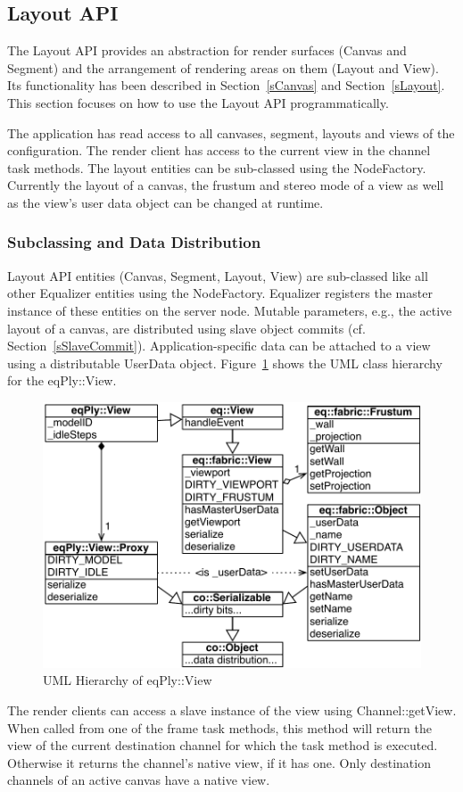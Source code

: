\documentclass[10pt,a4]{scrartcl}
\newcommand{\fig}[1]{Figure~\ref{#1}}
\newcommand{\sref}[1]{Section~\ref{#1}}
\begin{document}
\subsection{\label{sLayoutAPI}Layout API}

The Layout API provides an abstraction for render surfaces (Canvas and
Segment) and the arrangement of rendering areas on them (Layout and
View). Its functionality has been described in \sref{sCanvas} and
\sref{sLayout}. This section focuses on how to use the Layout API
programmatically. 

The application has read access to all canvases, segment, layouts and views of
the configuration. The render client has access to the current view in the
channel task methods. The layout entities can be sub-classed using the
\textsf{NodeFactory}. Currently the layout of a canvas, the frustum and stereo
mode of a view as well as the view's user data object can be changed at runtime.


\subsubsection{Subclassing and Data Distribution}

Layout API entities (Canvas, Segment, Layout, View) are sub-classed like all
other Equalizer entities using the \textsf{NodeFactory}. Equalizer registers the
master instance of these entities on the server node. Mutable parameters, e.g.,
the active layout of a canvas, are distributed using slave object commits
(cf. \sref{sSlaveCommit}). Application-specific data can be attached to a view
using a distributable \textsf{UserData} object. \fig{fViewUML} shows the UML
class hierarchy for the \textsf{eqPly::View}.

\begin{figure}
  \includegraphics[width=.612\textwidth]{images/viewUML.pdf}
  {\caption{\label{fViewUML}UML Hierarchy of \textsf{eqPly::View}}}
\end{figure}
The render clients can access a slave instance of the view using
\textsf{Channel::getView}. When called from one of the frame task
methods, this method will return the view of the current destination
channel for which the task method is executed. Otherwise it returns the
channel's native view, if it has one. Only destination channels of an
active canvas have a native view.
\end{document}
